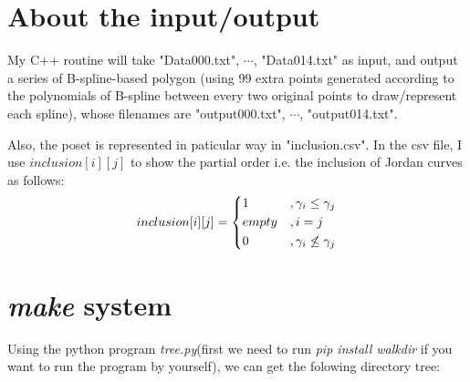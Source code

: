 \documentclass[]{article}
\begin{document}

\section{About the input/output}
\par
My C++ routine will take "Data000.txt", $\cdots$, "Data014.txt" as input, and output a series of B-spline-based polygon
(using 99 extra points generated according to the polynomials of B-spline between every two original points to draw/represent each spline), 
whose filenames are "output000.txt", $\cdots$, "output014.txt".\par
Also, the poset is represented in paticular way in "inclusion.csv". 
In the csv file, I use $inclusion[i][j]$ to show the partial order i.e. the inclusion of Jordan curves as follows:
$$inclusion[i][j] = \begin{dcases}
	1 &, \gamma_i \leq \gamma_j \\
	empty &, i = j \\
	0 &, \gamma_i \not\leq \gamma_j
\end{dcases}$$




\section{\textit{make} system}
Using the python program \textit{tree.py}(first we need to run \textit{pip install walkdir} if you want to run the program by yourself), 
we can get the folowing directory tree:


\end{document}
